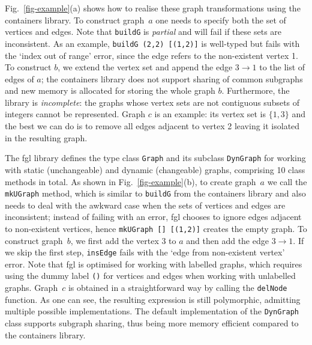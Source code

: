 \documentclass[acmlarge,anonymous]{acmart}\settopmatter{printfolios=true}
\newcommand{\hs}{\texttt}
\begin{document}

Fig.~\ref{fig-example}(a) shows how to realise these graph transformations
using the \textsf{containers} library. To construct graph~$a$ one needs
to specify both the set of vertices and edges. Note that
\hs{buildG} is \emph{partial} and will fail if these sets are inconsistent.
As an example, \hs{buildG (2,2) [(1,2)]} is well-typed but fails with the
\textsf{`index out of range'} error, since the edge refers to the non-existent vertex 1.
To construct $b$, we extend the vertex set and append the
edge $3 \rightarrow 1$ to the list of edges of $a$; the \textsf{containers} library does
not support sharing of common subgraphs and new memory is allocated for
storing the whole graph $b$. Furthermore, the library is
\emph{incomplete}: the graphs whose vertex sets are not contiguous subsets of
integers cannot be represented. Graph $c$ is an example: its vertex set is
$\{1,3\}$ and the best we can do is to remove all edges adjacent to vertex 2
leaving it isolated in the resulting graph.

The \textsf{fgl} library defines the type class \hs{Graph} and its subclass
\hs{DynGraph} for working with static (unchangeable) and dynamic (changeable)
graphs, comprising 10 class methods in total. As shown in Fig.~\ref{fig-example}(b),
to create graph~$a$ we call the \hs{mkUGraph} method, which is similar to
\hs{buildG} from the \textsf{containers} library and also needs to deal with the
awkward case when the sets of vertices and edges are inconsistent; instead of
failing with an error, \textsf{fgl} chooses to ignore edges adjacent to non-existent
vertices, hence \hs{mkUGraph [] [(1,2)]} creates the empty graph. To construct
graph~$b$, we first add the vertex 3 to $a$ and then add the edge $3 \rightarrow 1$.
If we skip the first step, \hs{insEdge} fails with the
\textsf{`edge from non-existent vertex'} error.
Note that \textsf{fgl} is optimised for working with labelled graphs, which requires
using the dummy label \hs{()} for vertices and edges when working with unlabelled
graphs. Graph~$c$ is obtained in a straightforward way by calling the \hs{delNode}
function. As one can see, the resulting expression is still polymorphic, admitting
multiple possible implementations. The default implementation of the \hs{DynGraph}
class supports subgraph sharing, thus being more memory efficient compared to
the \textsf{containers} library.
\end{document}
